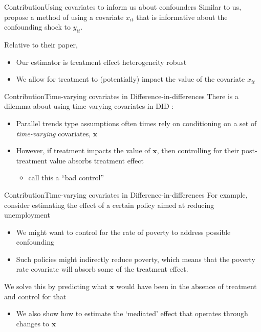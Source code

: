 \documentclass[aspectratio=169,t,11pt,table]{beamer}
\def\*#1{\mathbf{#1}}
\begin{document}
\begin{frame}{Contribution}{Using covariates to inform us about confounders}
  Similar to us, \citet{freyaldenhoven2019pre} propose a method of using a covariate $x_{it}$ that is informative about the confounding shock to $y_{it}$.
  
  \bigskip
  Relative to their paper,
  \begin{itemize}
    \item Our estimator is treatment effect heterogeneity robust
    
    \item We allow for treatment to (potentially) impact the value of the covariate $x_{it}$
  \end{itemize}
\end{frame}

\begin{frame}{Contribution}{Time-varying covariates in Difference-in-differences}
  There is a dilemma about using time-varying covariates in DID \citep{Caetano_Callaway_Payne_Rodrigues_2022}:

  \begin{itemize}
    \item Parallel trends type assumptions often times rely on conditioning on a set of \emph{time-varying} covariates, $\*x$

    \item However, if treatment impacts the value of $\*x$, then controlling for their post-treatment value absorbs treatment effect
    \begin{itemize}
      \item \citet{angrist2009mostly} call this a ``bad control''
    \end{itemize}
  \end{itemize}
\end{frame}

\begin{frame}{Contribution}{Time-varying covariates in Difference-in-differences}
  For example, consider estimating the effect of a certain policy aimed at reducing unemployment
  \begin{itemize}
    \item We might want to control for the rate of poverty to address possible confounding
    
    \item Such policies might indirectly reduce poverty, which means that the poverty rate covariate will absorb some of the treatment effect.
  \end{itemize}

  \pause
  \bigskip 
  We solve this by predicting what $\*x$ would have been in the absence of treatment and control for that
  \begin{itemize}
    \item We also show how to estimate the `mediated' effect that operates through changes to $\*x$
  \end{itemize}
\end{frame}
\end{document}
